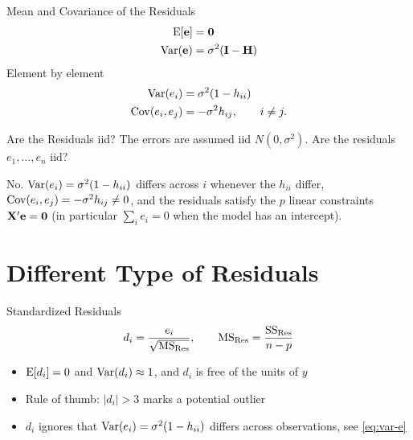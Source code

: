 \begin{frame}{Mean and Covariance of the Residuals}
    \begin{align}
        \operatorname{E}[\mathbf{e}] &= \mathbf{0} \notag \\
        \operatorname{Var}(\mathbf{e}) &= \sigma^2(\mathbf{I}-\mathbf{H}) \label{eq:var-e}
    \end{align}
    Element by element
    \begin{align*}
        \operatorname{Var}(e_i) &= \sigma^2(1-h_{ii}) \\
        \operatorname{Cov}(e_i,e_j) &= -\sigma^2 h_{ij}, \qquad i\neq j .
    \end{align*}
\end{frame}


\begin{frame}{Are the Residuals iid?}
    The errors are assumed iid $N(0,\sigma^2)$. Are the residuals $e_1,\dots,e_n$ iid?

    \pause

    \svspace{1em}

    No. $\operatorname{Var}(e_i)=\sigma^2(1-h_{ii})$ differs across $i$ whenever the $h_{ii}$ differ, $\operatorname{Cov}(e_i,e_j)=-\sigma^2h_{ij}\neq 0$, and the residuals satisfy the $p$ linear constraints $\mathbf{X}'\mathbf{e}=\mathbf{0}$ (in particular $\sum_i e_i=0$ when the model has an intercept).
\end{frame}


\section{Different Type of Residuals}


\begin{frame}{Standardized Residuals}
    \begin{align}
        d_i = \frac{e_i}{\sqrt{\mathrm{MS}_{\mathrm{Res}}}}, \qquad \mathrm{MS}_{\mathrm{Res}}=\frac{\mathrm{SS}_{\mathrm{Res}}}{n-p} \label{eq:d}
    \end{align}
    \begin{itemize}
        \item $\operatorname{E}[d_i]=0$ and $\operatorname{Var}(d_i)\approx 1$, and $d_i$ is free of the units of $y$
        \item Rule of thumb: $|d_i|>3$ marks a potential outlier
        \item $d_i$ ignores that $\operatorname{Var}(e_i)=\sigma^2(1-h_{ii})$ differs across observations, see \eqref{eq:var-e}
    \end{itemize}
\end{frame}


